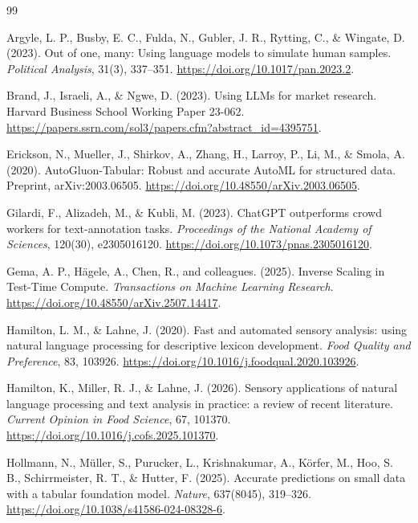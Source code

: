 \documentclass[12pt]{article}
\begin{document}

\begin{thebibliography}{99}

Argyle, L. P., Busby, E. C., Fulda, N., Gubler, J. R., Rytting, C., \& Wingate, D. (2023).
Out of one, many: Using language models to simulate human samples.
\textit{Political Analysis}, 31(3), 337--351.
\url{https://doi.org/10.1017/pan.2023.2}.

Brand, J., Israeli, A., \& Ngwe, D. (2023).
Using LLMs for market research.
Harvard Business School Working Paper 23-062.
\url{https://papers.ssrn.com/sol3/papers.cfm?abstract_id=4395751}.

Erickson, N., Mueller, J., Shirkov, A., Zhang, H., Larroy, P., Li, M., \& Smola, A. (2020).
AutoGluon-Tabular: Robust and accurate AutoML for structured data.
Preprint, arXiv:2003.06505.
\url{https://doi.org/10.48550/arXiv.2003.06505}.

Gilardi, F., Alizadeh, M., \& Kubli, M. (2023).
ChatGPT outperforms crowd workers for text-annotation tasks.
\textit{Proceedings of the National Academy of Sciences}, 120(30), e2305016120.
\url{https://doi.org/10.1073/pnas.2305016120}.

Gema, A. P., H{\"a}gele, A., Chen, R., and colleagues. (2025).
Inverse Scaling in Test-Time Compute.
\textit{Transactions on Machine Learning Research}.
\url{https://doi.org/10.48550/arXiv.2507.14417}.

Hamilton, L. M., \& Lahne, J. (2020).
Fast and automated sensory analysis: using natural language processing for descriptive lexicon development.
\textit{Food Quality and Preference}, 83, 103926.
\url{https://doi.org/10.1016/j.foodqual.2020.103926}.

Hamilton, K., Miller, R. J., \& Lahne, J. (2026).
Sensory applications of natural language processing and text analysis in practice: a review of recent literature.
\textit{Current Opinion in Food Science}, 67, 101370.
\url{https://doi.org/10.1016/j.cofs.2025.101370}.

Hollmann, N., M{\"u}ller, S., Purucker, L., Krishnakumar, A., K{\"o}rfer, M., Hoo, S. B., Schirrmeister, R. T., \& Hutter, F. (2025).
Accurate predictions on small data with a tabular foundation model.
\textit{Nature}, 637(8045), 319--326.
\url{https://doi.org/10.1038/s41586-024-08328-6}.


\end{thebibliography}
\end{document}
